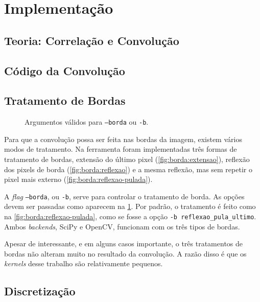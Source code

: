 \section{Implementação} \label{sec:impl}

\subsection{Teoria: Correlação e Convolução}

    

\subsection{Código da Convolução}

    

\subsection{Tratamento de Bordas}

    \begin{figure}[H]
        \centering
        

        \caption{Argumentos válidos para \texttt{--borda} ou \texttt{-b}.}
        \label{fig:borda}
    \end{figure}

    Para que a convolução possa ser feita nas bordas da imagem, existem vários modos de tratamento. Na ferramenta foram implementadas três formas de tratamento de bordas, extensão do último pixel (\ref{fig:borda:extensao}), reflexão dos pixels de borda (\ref{fig:borda:reflexao}) e a mesma reflexão, mas sem repetir o pixel mais externo (\ref{fig:borda:reflexao-pulada}).

    A \textit{flag} \texttt{--borda}, ou \texttt{-b}, serve para controlar o tratamento de borda. As opções devem ser passadas como aparecem na \cref{fig:borda}. Por padrão, o tratamento é feito como na \cref{fig:borda:reflexao-pulada}, como se fosse a opção \texttt{-b reflexao_pula_ultimo}. Ambos \textit{backends}, SciPy e OpenCV, funcionam com os três tipos de bordas.

    Apesar de interessante, e em alguns casos importante, o três tratamentos de bordas não alteram muito no resultado da convolução. A razão disso é que os \textit{kernels} desse trabalho são relativamente pequenos.

\subsection{Discretização}


